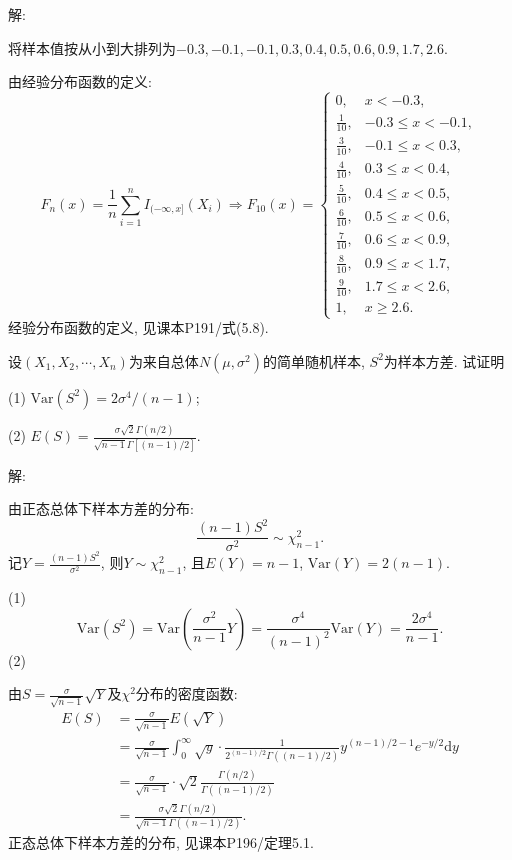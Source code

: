 \documentclass[standard]{ExBook}
\renewenvironment{shaded}{%
  \def\FrameCommand{\fboxsep=\FrameSep \colorbox{shadecolor}}%
  \MakeFramed{\advance\hsize-\width \FrameRestore}%
}{%
  \endMakeFramed
}
\begin{document}
\begin{qitems}
\vspace{\dimexpr2.5cm-5em\relax}

解:

将样本值按从小到大排列为$-0.3,-0.1,-0.1,0.3,0.4,0.5,0.6,0.9,1.7,2.6$.

由经验分布函数的定义:
$$
F_n(x)=\frac{1}{n}\sum\limits_{i=1}^{n}I_{(-\infty,x]}(X_i)
\Longrightarrow
F_{10}(x)=
\left\{
\begin{array}{ll}
0, & x<-0.3,\\
\frac{1}{10}, & -0.3\leq x<-0.1,\\
\frac{3}{10}, & -0.1\leq x<0.3,\\
\frac{4}{10}, & 0.3\leq x<0.4,\\
\frac{5}{10}, & 0.4\leq x<0.5,\\
\frac{6}{10}, & 0.5\leq x<0.6,\\
\frac{7}{10}, & 0.6\leq x<0.9,\\
\frac{8}{10}, & 0.9\leq x<1.7,\\
\frac{9}{10}, & 1.7\leq x<2.6,\\
1, & x\geq2.6.
\end{array}
\right.
$$
\textcolor{themeColor}{\selectfont {} 经验分布函数的定义, 见课本P191/式(5.8).}

\vspace{2.5cm-5em}

    \begin{bbox}
    \begin{shaded}
        \qitem
设$(X_1, X_2, \cdots, X_n)$为来自总体$N(\mu,\sigma^2)$的简单随机样本, $S^2$为样本方差. 试证明

(1) $\text{Var}(S^2) = 2\sigma^4 \big/ (n-1)$;

(2) $E(S)=\displaystyle\frac{\sigma\sqrt{2}\Gamma(n/2)}{\sqrt{n-1}\Gamma\left[(n-1)/2\right]}$.
    \end{shaded}
    \end{bbox}

\vspace{\dimexpr2.5cm-5em\relax}

解:

由正态总体下样本方差的分布:
$$
\frac{(n-1)S^2}{\sigma^2}\sim \chi_{n-1}^2.
$$
记$Y=\frac{(n-1)S^2}{\sigma^2}$, 则$Y\sim \chi_{n-1}^2$, 且$E(Y)=n-1$, $\mathrm{Var}(Y)=2(n-1)$.

(1)
$$
\mathrm{Var}(S^2)=\mathrm{Var}\left(\frac{\sigma^2}{n-1}Y\right)=\frac{\sigma^4}{(n-1)^2}\mathrm{Var}(Y)=\frac{2\sigma^4}{n-1}.
$$
(2)

由$S=\frac{\sigma}{\sqrt{n-1}}\sqrt{Y}$及$\chi^2$分布的密度函数:
$$
\begin{aligned}
E(S)
&=\frac{\sigma}{\sqrt{n-1}}E(\sqrt{Y})\\
&=\frac{\sigma}{\sqrt{n-1}}\int_{0}^{\infty}\sqrt{y}\cdot 
\frac{1}{2^{(n-1)/2}\Gamma((n-1)/2)}y^{(n-1)/2-1}e^{-y/2}\mathrm{d}y\\
&=\frac{\sigma}{\sqrt{n-1}}\cdot\sqrt{2}
\frac{\Gamma(n/2)}{\Gamma((n-1)/2)}\\
&=\frac{\sigma\sqrt{2}\Gamma(n/2)}{\sqrt{n-1}\Gamma((n-1)/2)}.
\end{aligned}
$$
\textcolor{themeColor}{\selectfont {} 正态总体下样本方差的分布, 见课本P196/定理5.1.}


\end{qitems}
\end{document}
